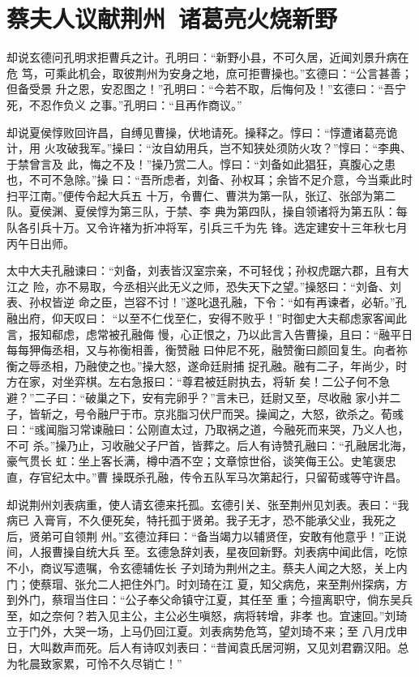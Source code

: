 \chapter{蔡夫人议献荆州~诸葛亮火烧新野}

却说玄德问孔明求拒曹兵之计。孔明曰：“新野小县，不可久居，近闻刘景升病在危
笃，可乘此机会，取彼荆州为安身之地，庶可拒曹操也。”玄德曰：“公言甚善；但备受景
升之恩，安忍图之！”孔明曰：“今若不取，后悔何及！”玄德曰：“吾宁死，不忍作负义
之事。”孔明曰：“且再作商议。”

却说夏侯惇败回许昌，自缚见曹操，伏地请死。操释之。惇曰：“惇遭诸葛亮诡计，用
火攻破我军。”操曰：“汝自幼用兵，岂不知狭处须防火攻？”惇曰：“李典、于禁曾言及
此，悔之不及！”操乃赏二人。惇曰：“刘备如此猖狂，真腹心之患也，不可不急除。”操
曰：“吾所虑者，刘备、孙权耳；余皆不足介意，今当乘此时扫平江南。”便传令起大兵五
十万，令曹仁、曹洪为第一队，张辽、张郃为第二队。夏侯渊、夏侯惇为第三队，于禁、李
典为第四队，操自领诸将为第五队：每队各引兵十万。又令许褚为折冲将军，引兵三千为先
锋。选定建安十三年秋七月丙午日出师。

太中大夫孔融谏曰：“刘备，刘表皆汉室宗亲，不可轻伐；孙权虎踞六郡，且有大江之
险，亦不易取，今丞相兴此无义之师，恐失天下之望。”操怒曰：“刘备、刘表、孙权皆逆
命之臣，岂容不讨！”遂叱退孔融，下令：“如有再谏者，必斩。”孔融出府，仰天叹曰：
“以至不仁伐至仁，安得不败乎！”时御史大夫郗虑家客闻此言，报知郗虑，虑常被孔融侮
慢，心正恨之，乃以此言入告曹操，且曰：“融平日每每狎侮丞相，又与祢衡相善，衡赞融
曰仲尼不死，融赞衡曰颜回复生。向者祢衡之辱丞相，乃融使之也。”操大怒，遂命廷尉捕
捉孔融。融有二子，年尚少，时方在家，对坐弈棋。左右急报曰：“尊君被廷尉执去，将斩
矣！二公子何不急避？”二子曰：“破巢之下，安有完卵乎？”言未已，廷尉又至，尽收融
家小并二子，皆斩之，号令融尸于市。京兆脂习伏尸而哭。操闻之，大怒，欲杀之。荀彧
曰：“彧闻脂习常谏融曰：公刚直太过，乃取祸之道，今融死而来哭，乃义人也，不可
杀。”操乃止，习收融父子尸首，皆葬之。后人有诗赞孔融曰：“孔融居北海，豪气贯长
虹：坐上客长满，樽中酒不空；文章惊世俗，谈笑侮王公。史笔褒忠直，存官纪太中。”曹
操既杀孔融，传令五队军马次第起行，只留荀彧等守许昌。

却说荆州刘表病重，使人请玄德来托孤。玄德引关、张至荆州见刘表。表曰：“我病已
入膏肓，不久便死矣，特托孤于贤弟。我子无才，恐不能承父业，我死之后，贤弟可自领荆
州。”玄德泣拜曰：“备当竭力以辅贤侄，安敢有他意乎！”正说间，人报曹操自统大兵
至。玄德急辞刘表，星夜回新野。刘表病中闻此信，吃惊不小，商议写遗嘱，令玄德辅佐长
子刘琦为荆州之主。蔡夫人闻之大怒，关上内门；使蔡瑁、张允二人把住外门。时刘琦在江
夏，知父病危，来至荆州探病，方到外门，蔡瑁当住曰：“公子奉父命镇守江夏，其任至
重；今擅离职守，倘东吴兵至，如之奈何？若入见主公，主公必生嗔怒，病将转增，非孝
也。宜速回。”刘琦立于门外，大哭一场，上马仍回江夏。刘表病势危笃，望刘琦不来；至
八月戊申日，大叫数声而死。后人有诗叹刘表曰：“昔闻袁氏居河朔，又见刘君霸汉阳。总
为牝晨致家累，可怜不久尽销亡！”

